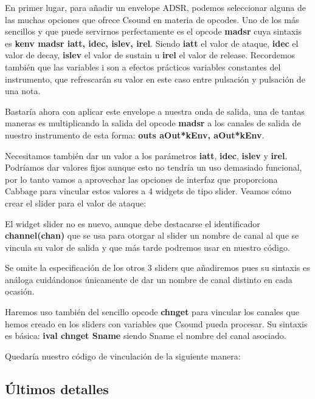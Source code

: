 En primer lugar, para añadir un envelope ADSR, podemos seleccionar alguna de las muchas opciones que ofrece Csound en materia de opcodes. Uno de los más sencillos y que puede servirnos perfectamente es el opcode \textbf{madsr} cuya sintaxis es \textbf{kenv madsr iatt, idec, islev, irel}. Siendo \textbf{iatt} el valor de ataque, \textbf{idec} el valor de decay, \textbf{islev} el valor de sustain u \textbf{irel} el valor de release. Recordemos también que las variables i son a efectos prácticos variables constantes del instrumento, que refrescarán su valor en este caso entre pulsación y pulsación de una nota.

Bastaría ahora con aplicar este envelope a nuestra onda de salida, una de tantas maneras es multiplicando la salida del opcode \textbf{madsr} a los canales de salida de nuestro instrumento de esta forma: \textbf{outs aOut*kEnv, aOut*kEnv}.

Necesitamos también dar un valor a los parámetros \textbf{iatt}, \textbf{idec}, \textbf{islev} y \textbf{irel}. Podríamos dar valores fijos aunque esto no tendría un uso demasiado funcional, por lo tanto vamos a aprovechar las opciones de interfaz que proporciona Cabbage para vincular estos valores a 4 widgets de tipo slider.
Veamos cómo crear el slider para el valor de ataque:
\pagebreak 
{}

El widget slider no es nuevo, aunque debe destacarse el identificador \textbf{channel(chan)} que se usa para otorgar al slider un nombre de canal al que se vincula su valor de salida y que más tarde podremos usar en nuestro código.

Se omite la especificación de los otros 3 sliders que añadiremos pues su sintaxis es análoga cuidándonos únicamente de dar un nombre de canal distinto en cada ocasión.

Haremos uso también del sencillo opcode \textbf{chnget} para vincular los canales que hemos creado en los sliders con variables que Csound pueda procesar. Su sintaxis es básica: \textbf{ival chnget Sname} siendo Sname el nombre del canal asociado.

Quedaría nuestro código de vinculación de la siguiente manera:


\subsection{Últimos detalles}\label{sec:detalles}

